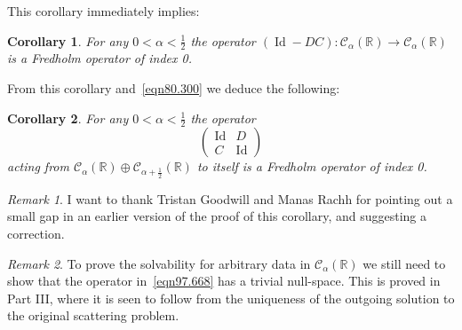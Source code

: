 \documentclass[11pt]{article}
\newcommand\cC{\mathcal{C}}
\newcommand\bbR{\mathbb R}
\newcommand\Id{\operatorname{Id}}
\newtheorem{corollary}{Corollary}
\theoremstyle{definition}
\theoremstyle{remark}
\newtheorem{remark}{Remark}
\begin{document}
   This corollary  immediately implies:
   \begin{corollary}For any $0<\alpha<\frac 12$ the operator
     $(\Id-DC):\cC_{\alpha}(\bbR)\to \cC_{\alpha}(\bbR)$ is a Fredholm operator of
   index 0.
   \end{corollary}

   \noindent
   From this corollary and~\eqref{eqn80.300} we deduce the following:
   \begin{corollary} For any $0<\alpha<\frac 12$ the operator
     \begin{equation}\label{eqn97.668}
       \left(\begin{matrix}\Id& D\\C&\Id\end{matrix}\right)
     \end{equation}
     acting from $ \cC_{\alpha}(\bbR)\oplus \cC_{\alpha+\frac
       12}(\bbR)$ to itself is a Fredholm operator of index 0.
   \end{corollary}
   \begin{remark}
     I want to thank Tristan Goodwill and Manas Rachh for pointing out
     a small gap in an earlier version of the proof of this corollary, and suggesting a
     correction.
   \end{remark}

   \begin{remark}
  To prove the solvability for arbitrary data in $\cC_{\alpha}(\bbR)$
  we still need to show that the operator in~\eqref{eqn97.668} has a
  trivial null-space. This is proved in Part III, where it is seen to
  follow from the uniqueness of the outgoing solution to the original
  scattering problem.
  \end{remark}
  
\end{document}

